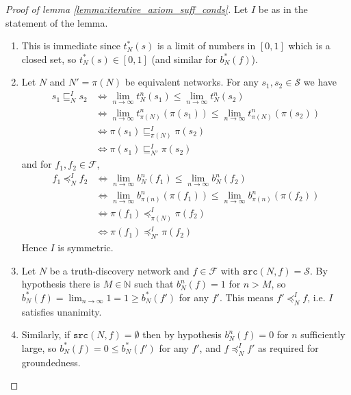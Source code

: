 \documentclass{article}
\theoremstyle{definition} \newtheorem{definition}{Definition}
\theoremstyle{definition} \newtheorem{example}{Example}
\theoremstyle{plain} \newtheorem{axiom}{Axiom}
\theoremstyle{plain} \newtheorem*{remark}{Remark}
\theoremstyle{remark} \newtheorem*{notation}{Notation}
\theoremstyle{plain} \newtheorem{lemma}{Lemma}
\theoremstyle{plain} \newtheorem{theorem}{Theorem}
\theoremstyle{plain} \newtheorem{proposition}{Proposition}
\renewcommand{\S}{\mathcal{S}}  %
\newcommand{\F}{\mathcal{F}}
\newcommand{\Nat}{\mathbb{N}}
\newcommand{\sle}{\sqsubseteq}
\newcommand{\fle}{\preceq}
\newcommand{\src}{\texttt{src}}
\begin{document}
\begin{proof}[Proof of lemma \ref{lemma:iterative_axiom_suff_conds}]
Let $I$ be as in the statement of the lemma.

\begin{enumerate}

\item This is immediate since $t_N^*(s)$ is a limit of numbers in $[0, 1]$
which is a closed set, so $t_N^*(s) \in [0, 1]$ (and similar for $b_N^*(f)$).

\item Let $N$ and $N' = \pi(N)$ be equivalent networks.  For any $s_1, s_2 \in
\S$ we have
\begin{align*}
    s_1 \sle_N^I s_2
        & \iff \lim_{n \rightarrow \infty}{t_N^n(s_1)} \le
            \lim_{n \rightarrow \infty}{t_N^n(s_2)} \\
        & \iff \lim_{n \rightarrow \infty}{t_{\pi(N)}^n(\pi(s_1))} \le
            \lim_{n \rightarrow \infty}{t_{\pi(N)}^n(\pi(s_2))} \\
        & \iff \pi(s_1) \sle_{\pi(N)}^I \pi(s_2) \\
        & \iff \pi(s_1) \sle_{N'}^I \pi(s_2)
\end{align*}
and for $f_1, f_2 \in \F$,
\begin{align*}
    f_1 \fle_N^I f_2
        & \iff \lim_{n \rightarrow \infty}{b_N^n(f_1)} \le
            \lim_{n \rightarrow \infty}{b_N^n(f_2)} \\
        & \iff \lim_{n \rightarrow \infty}{b_{\pi(n)}^n(\pi(f_1))} \le
            \lim_{n \rightarrow \infty}{b_{\pi(n)}^n(\pi(f_2))} \\
        & \iff \pi(f_1) \fle_{\pi(N)}^I \pi(f_2) \\
        & \iff \pi(f_1) \fle_{N'}^I \pi(f_2)
\end{align*}
Hence $I$ is symmetric.

\item Let $N$ be a truth-discovery network and $f \in \F$ with $\src(N, f) =
\S$. By hypothesis there is $M \in \Nat$ such that $b_N^n(f) = 1$ for $n > M$,
so $b_N^*(f)=\lim_{n \rightarrow \infty}{1} = 1 \ge b_N^*(f')$ for any $f'$.
This means $f' \fle_N^I f$, i.e. $I$ satisfies unanimity.

\item Similarly, if $\src(N, f) = \emptyset$ then by hypothesis $b_N^n(f) = 0$
for $n$ sufficiently large, so $b_N^*(f)=0 \le b_N^*(f')$ for any $f'$, and $f
\fle_N^I f'$ as required for groundedness.


\end{enumerate}
\end{proof}
\end{document}
